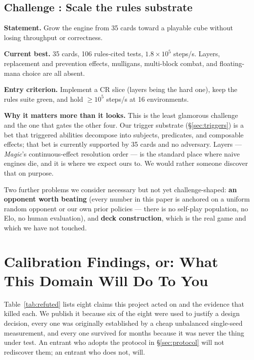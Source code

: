 \documentclass[11pt]{article}
\newcounter{challenge}
\renewcommand{\thechallenge}{\arabic{challenge}}
\newcommand{\challenge}[2]{%
  \refstepcounter{challenge}%
  \subsection*{Challenge \thechallenge: #1}\label{#2}}
\begin{document}
\challenge{Scale the rules substrate}{ch:rules}

\textbf{Statement.} Grow the engine from 35 cards toward a playable cube without losing throughput or correctness.

\textbf{Current best.} 35 cards, 106 rules-cited tests, $1.8\times10^{5}$ steps/s. Layers, replacement and prevention effects, mulligans, multi-block combat, and floating-mana choice are all absent.

\textbf{Entry criterion.} Implement a CR slice (layers being the hard one), keep the rules suite green, and hold $\ge10^{5}$ steps/s at 16 environments.

\textbf{Why it matters more than it looks.} This is the least glamorous challenge and the one that gates the other four. Our trigger substrate (\S\ref{sec:triggers}) is a bet that triggered abilities decompose into subjects, predicates, and composable effects; that bet is currently supported by 35 cards and no adversary. Layers --- \textit{Magic}'s continuous-effect resolution order --- is the standard place where naive engines die, and it is where we expect ours to. We would rather someone discover that on purpose.

\medskip
\noindent Two further problems we consider necessary but not yet challenge-shaped: \textbf{an opponent worth beating} (every number in this paper is anchored on a uniform random opponent or our own prior policies --- there is no self-play population, no Elo, no human evaluation), and \textbf{deck construction}, which is the real game and which we have not touched.

\section{Calibration Findings, or: What This Domain Will Do To You}
\label{sec:pitfalls}

Table~\ref{tab:refuted} lists eight claims this project acted on and the evidence that killed each. We publish it because six of the eight were used to justify a design decision, every one was originally established by a cheap unbalanced single-seed measurement, and every one survived for months because it was never the thing under test. An entrant who adopts the protocol in \S\ref{sec:protocol} will not rediscover them; an entrant who does not, will.
\end{document}
